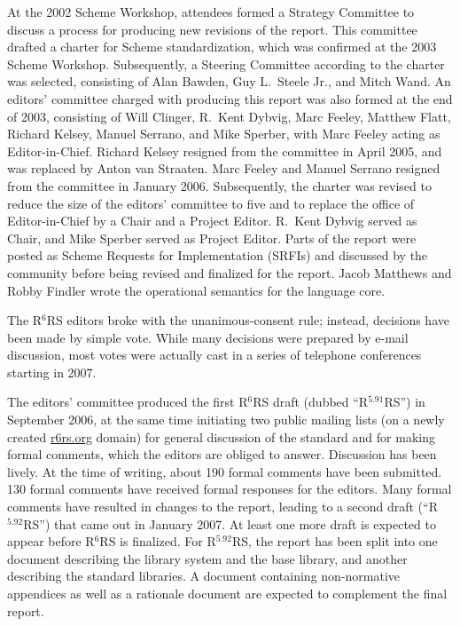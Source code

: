 \documentclass{sigplanconf}
\newcommand{\rn}[1]{R$^{#1}$RS}
\begin{document}
At the 2002 Scheme Workshop, attendees formed a Strategy Committee to
discuss a process for producing new revisions of the report.  This
committee drafted a charter for Scheme standardization, which was
confirmed at the 2003 Scheme Workshop.  Subsequently, a Steering
Committee according to the charter was selected, consisting of Alan
Bawden, Guy L.\ Steele Jr., and Mitch Wand.  An editors' committee
charged with producing this report was also formed at the end of 2003,
consisting of Will Clinger, R.\ Kent Dybvig, Marc Feeley, Matthew
Flatt, Richard Kelsey, Manuel Serrano, and Mike Sperber, with Marc
Feeley acting as Editor-in-Chief.  Richard Kelsey resigned from the
committee in April 2005, and was replaced by Anton van Straaten.  Marc
Feeley and Manuel Serrano resigned from the committee in January 2006.
Subsequently, the charter was revised to reduce the size of the
editors' committee to five and to replace the office of
Editor-in-Chief by a Chair and a Project Editor.  R.\ Kent Dybvig
served as Chair, and Mike Sperber served as Project Editor.  Parts of
the report were posted as Scheme Requests for Implementation (SRFIs)
and discussed by the community before being revised and finalized for
the report.  Jacob Matthews and Robby Findler wrote the operational
semantics for the language core.

The \rn{6} editors broke with the unanimous-consent rule; instead,
decisions have been made by simple vote.  While many decisions were
prepared by e-mail discussion, most votes were actually cast in a
series of telephone conferences starting in 2007.

The editors' committee produced the first \rn{6} draft (dubbed
``\rn{5.91}'') in September 2006, at the same time initiating two
public mailing lists (on a newly created \url{r6rs.org} domain) for general
discussion of the standard and for making formal comments, which the
editors are obliged to answer.  Discussion has been lively.  At the
time of writing, about 190 formal comments have been submitted.  130
formal comments have received formal responses for the editors.  Many
formal comments have resulted in changes to the report, leading to a
second draft (``\rn{5.92}'') that came out in January 2007.  At least one
more draft is expected to appear before \rn{6} is finalized.  For
\rn{5.92}, the report has been split into one document describing the
library system and the base library, and another describing the
standard libraries.  A document containing non-normative appendices as
well as a rationale document are expected to complement the final
report.
\end{document}
